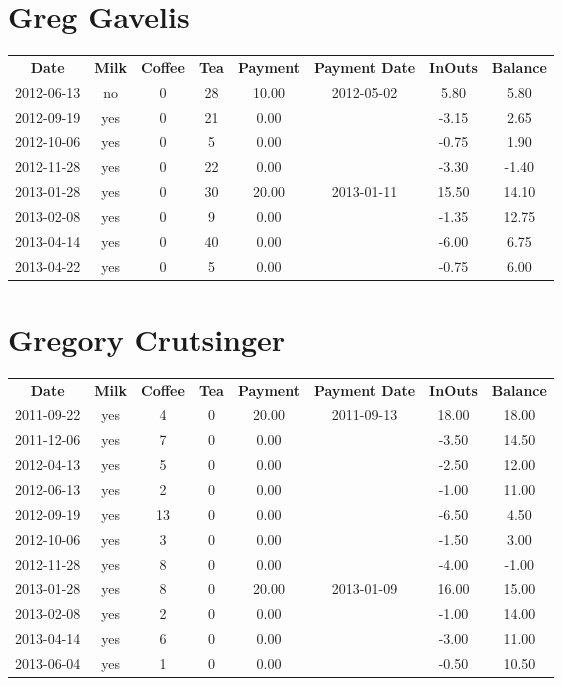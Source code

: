 \section{Greg Gavelis}

\begin{center}
\begin{tabular}{cccccccc}
\textbf{Date} & \textbf{Milk} & \textbf{Coffee} & \textbf{Tea} & \textbf{Payment} & \textbf{Payment Date} & \textbf{InOuts} & \textbf{Balance} \\
2012-06-13 & no & 0 & 28 & 10.00 & 2012-05-02 &  5.80 &  5.80\\ 
2012-09-19 & yes & 0 & 21 &  0.00 &  & -3.15 &  2.65\\ 
2012-10-06 & yes & 0 &  5 &  0.00 &  & -0.75 &  1.90\\ 
2012-11-28 & yes & 0 & 22 &  0.00 &  & -3.30 & -1.40\\ 
2013-01-28 & yes & 0 & 30 & 20.00 & 2013-01-11 & 15.50 & 14.10\\ 
2013-02-08 & yes & 0 &  9 &  0.00 &  & -1.35 & 12.75\\ 
2013-04-14 & yes & 0 & 40 &  0.00 &  & -6.00 &  6.75\\ 
2013-04-22 & yes & 0 &  5 &  0.00 &  & -0.75 &  6.00
\end{tabular}
\end{center}

\section{Gregory Crutsinger}

\begin{center}
\begin{tabular}{cccccccc}
\textbf{Date} & \textbf{Milk} & \textbf{Coffee} & \textbf{Tea} & \textbf{Payment} & \textbf{Payment Date} & \textbf{InOuts} & \textbf{Balance} \\
2011-09-22 & yes &  4 & 0 & 20.00 & 2011-09-13 & 18.00 & 18.00\\ 
2011-12-06 & yes &  7 & 0 &  0.00 &  & -3.50 & 14.50\\ 
2012-04-13 & yes &  5 & 0 &  0.00 &  & -2.50 & 12.00\\ 
2012-06-13 & yes &  2 & 0 &  0.00 &  & -1.00 & 11.00\\ 
2012-09-19 & yes & 13 & 0 &  0.00 &  & -6.50 &  4.50\\ 
2012-10-06 & yes &  3 & 0 &  0.00 &  & -1.50 &  3.00\\ 
2012-11-28 & yes &  8 & 0 &  0.00 &  & -4.00 & -1.00\\ 
2013-01-28 & yes &  8 & 0 & 20.00 & 2013-01-09 & 16.00 & 15.00\\ 
2013-02-08 & yes &  2 & 0 &  0.00 &  & -1.00 & 14.00\\ 
2013-04-14 & yes &  6 & 0 &  0.00 &  & -3.00 & 11.00\\ 
2013-06-04 & yes &  1 & 0 &  0.00 &  & -0.50 & 10.50
\end{tabular}
\end{center}

